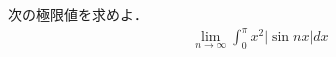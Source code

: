 \documentclass[../../main.tex]{subfiles}
\begin{document}
次の極限値を求めよ．
\begin{align}
  \lim_{n\to\infty}\int_0^\pi x^2|\sin nx|dx
\end{align}
\end{document}
